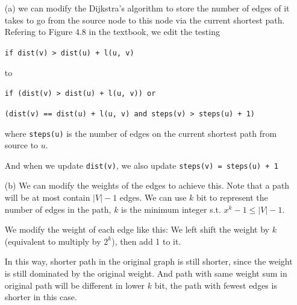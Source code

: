 \documentclass[twoside]{homework}
\begin{document}
\begin{enumerate}
\begin{figure}[!h]
	\end{figure}
\end{enumerate}

\section{}
\begin{enumerate}
	\item [(a)] we can modify the Dijkstra's algorithm to store the number of edges of it takes to go from the source node to this node via the current shortest path. Refering to Figure 4.8 in the textbook, we edit the testing

	\texttt{if dist(v) > dist(u) + l(u, v)}

	to

	\texttt{if (dist(v) > dist(u) + l(u, v)) or}

	\texttt{(dist(v) == dist(u) + l(u, v) and steps(v) > steps(u) + 1)}

	where \texttt{steps(u)} is the number of edges on the current shortest path from source to $u$.

	And when we update \texttt{dist(v)}, we also update \texttt{steps(v) = steps(u) + 1}

	\item [(b)] We can modify the weights of the edges to achieve this. Note that a path will be at most contain $|V| - 1$ edges. We can use $k$ bit to represent the number of edges in the path, $k$ is the minimum integer s.t. $x^k - 1 \leq |V| - 1$.

	We modify the weight of each edge like this: We left shift the weight by $k$ (equivalent to multiply by $2^k$), then add 1 to it.

	In this way, shorter path in the original graph is still shorter, since the weight is still dominated by the original weight. And path with same weight sum in original path will be different in lower $k$ bit, the path with fewest edges is shorter in this case.
\end{enumerate}


\end{document}

